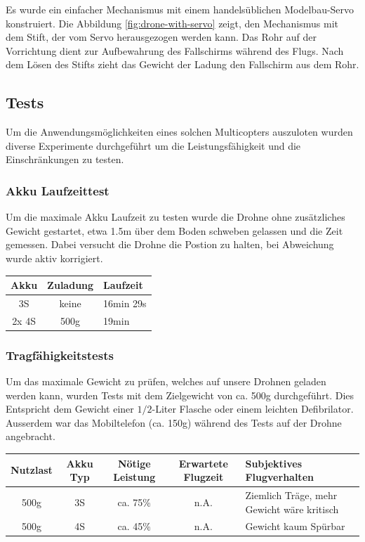 Es wurde ein einfacher Mechanismus mit einem handelsüblichen Modelbau-Servo konstruiert. Die Abbildung \ref{fig:drone-with-servo} zeigt, den Mechanismus mit dem Stift, der vom Servo herausgezogen werden kann. Das Rohr auf der Vorrichtung dient zur Aufbewahrung des Fallschirms während des Flugs. Nach dem Lösen des Stifts zieht das Gewicht der Ladung den Fallschirm aus dem Rohr.\\

\subsection{Tests}
Um die Anwendungsmöglichkeiten eines solchen Multicopters auszuloten wurden diverse Experimente durchgeführt um die Leistungsfähigkeit und die Einschränkungen zu testen.

\subsubsection{Akku Laufzeittest}
Um die maximale Akku Laufzeit zu testen wurde die Drohne ohne zusätzliches Gewicht gestartet, etwa 1.5m über dem Boden schweben gelassen und die Zeit gemessen. Dabei versucht die Drohne die Postion zu halten, bei Abweichung wurde aktiv korrigiert. \\

\begin{tabularx}{\textwidth}{|c|c|X|}
	\hline
	\textbf{Akku} & \textbf{Zuladung} & \textbf{Laufzeit} \\ \hline \hline
	3S & keine & 16min 29s\\ \hline
	2x 4S & 500g & 19min\\ \hline
\end{tabularx}

\subsubsection{Tragfähigkeitstests}
\label{sec:drone-gewichttest}

Um das maximale Gewicht zu prüfen, welches auf unsere Drohnen geladen werden kann, wurden Tests mit dem Zielgewicht von ca. 500g durchgeführt. Dies Entspricht dem Gewicht einer $1/2$-Liter Flasche oder einem leichten Defibrilator. Ausserdem war das Mobiltelefon (ca. 150g) während des Tests auf der Drohne angebracht.  \\

\begin{tabularx}{\textwidth}{|c|c|c|c|X|}
	\hline
	\textbf{Nutzlast} & \textbf{Akku Typ} & \textbf{Nötige Leistung }& \textbf{Erwartete Flugzeit } & \textbf{Subjektives Flugverhalten }\\
	\hline \hline
	500g & 3S & ca. 75\%  & n.A. & Ziemlich Träge, mehr Gewicht wäre kritisch\\\hline
	500g & 4S & ca. 45\%  & n.A. & Gewicht kaum Spürbar\\
	\hline
\end{tabularx}\\

